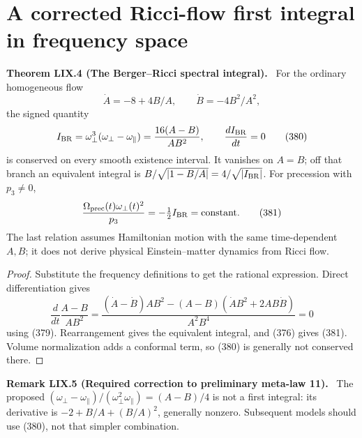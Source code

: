 \documentclass[11pt,a4paper,oneside]{book}
\newcommand{\statement}[3]{\par\medskip\noindent\textbf{#1 #2 (#3).}\ }
\begin{document}
\section{A corrected Ricci-flow first integral in frequency space}
\statement{Theorem}{LIX.4}{The Berger--Ricci spectral integral}
For the ordinary homogeneous flow
\begin{equation}\dot A=-8+4B/A,\qquad\dot B=-4B^2/A^2,\tag{379}\end{equation}
the signed quantity
\begin{equation}I_{\rm BR}=\omega_\perp^3(\omega_\perp-\omega_\parallel)=\frac{16(A-B)}{AB^2},\qquad\frac{dI_{\rm BR}}{dt}=0\tag{380}\end{equation}
is conserved on every smooth existence interval. It vanishes on $A=B$; off that branch an equivalent integral is $B/\sqrt{|1-B/A|}=4/\sqrt{|I_{\rm BR}|}$. For precession with $p_3\ne0$,
\begin{equation}\frac{\Omega_{\rm prec}(t)\omega_\perp(t)^2}{p_3}=-\tfrac12I_{\rm BR}=\text{constant}.\tag{381}\end{equation}
The last relation assumes Hamiltonian motion with the same time-dependent $A,B$; it does not derive physical Einstein--matter dynamics from Ricci flow.
\begin{proof}
Substitute the frequency definitions to get the rational expression. Direct differentiation gives
\[\frac d{dt}\frac{A-B}{AB^2}=\frac{(\dot A-\dot B)AB^2-(A-B)(\dot AB^2+2AB\dot B)}{A^2B^4}=0\]
using (379). Rearrangement gives the equivalent integral, and (376) gives (381). Volume normalization adds a conformal term, so (380) is generally not conserved there.
\end{proof}
\statement{Remark}{LIX.5}{Required correction to preliminary meta-law 11}
The proposed $(\omega_\perp-\omega_\parallel)/(\omega_\perp^2\omega_\parallel)=(A-B)/4$ is not a first integral: its derivative is $-2+B/A+(B/A)^2$, generally nonzero. Subsequent models should use (380), not that simpler combination.
\end{document}
